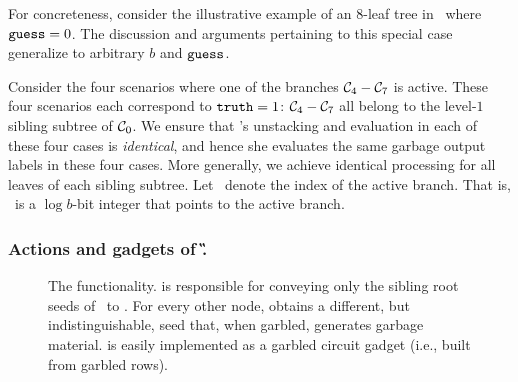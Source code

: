 For concreteness,
consider the illustrative example of an $8$-leaf tree in~ where $\mathtt{guess}=0$. 
The discussion and arguments pertaining to this special case generalize to arbitrary $b$ and $\mathtt{guess}$.

Consider the four scenarios where one of the branches $\mathcal C_4-\mathcal C_7$ is active.
These four scenarios each correspond
to $\mathtt{truth} = 1$: $\mathcal C_4-\mathcal C_7$ all belong to the level-$1$ sibling subtree of
$\mathcal C_0$.
%
We ensure that \E's unstacking and evaluation in each
of these four cases is \emph{identical}, and hence she evaluates the
same garbage output labels in these four cases.  More generally, we achieve identical processing for all leaves of each sibling subtree.
Let \aid\ denote the index of the active branch. That is, \aid\ is a $\log
b$-bit integer that points to the active branch.


\subsubsection{Actions and gadgets of \G.}

\begin{figure}[t!]\centering{}\caption{%
  The \gadgetlong functionality. \gadgetlong is
  responsible for conveying only the sibling root seeds of \aid\ to \E.
  For every other node, \E obtains a different, but indistinguishable,
  seed that, when garbled, generates garbage material.
  \gadgetlong is easily implemented as a garbled circuit gadget (i.e.,
  built from garbled rows).
}\label{fig:sortinghat}
\end{figure}


